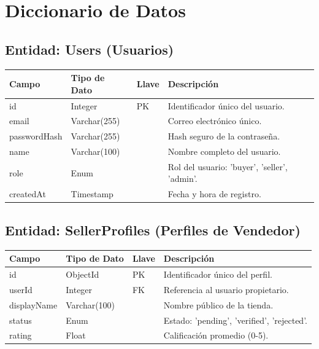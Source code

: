\documentclass{article}
\begin{document}
\section*{Diccionario de Datos}

\subsection*{Entidad: Users (Usuarios)}
\begin{longtable}{|p{3cm}|p{3cm}|p{1.5cm}|p{6cm}|}
\hline
\rowcolor{headergray} \textbf{Campo} & \textbf{Tipo de Dato} & \textbf{Llave} & \textbf{Descripción} \\ \hline
id & Integer & PK & Identificador único del usuario. \\ \hline
email & Varchar(255) & & Correo electrónico único. \\ \hline
passwordHash & Varchar(255) & & Hash seguro de la contraseña. \\ \hline
name & Varchar(100) & & Nombre completo del usuario. \\ \hline
role & Enum & & Rol del usuario: 'buyer', 'seller', 'admin'. \\ \hline
createdAt & Timestamp & & Fecha y hora de registro. \\ \hline
\end{longtable}

\subsection*{Entidad: SellerProfiles (Perfiles de Vendedor)}
\begin{longtable}{|p{3cm}|p{3cm}|p{1.5cm}|p{6cm}|}
\hline
\rowcolor{headergray} \textbf{Campo} & \textbf{Tipo de Dato} & \textbf{Llave} & \textbf{Descripción} \\ \hline
id & ObjectId & PK & Identificador único del perfil. \\ \hline
userId & Integer & FK & Referencia al usuario propietario. \\ \hline
displayName & Varchar(100) & & Nombre público de la tienda. \\ \hline
status & Enum & & Estado: 'pending', 'verified', 'rejected'. \\ \hline
rating & Float & & Calificación promedio (0-5). \\ \hline
\end{longtable}
\end{document}
